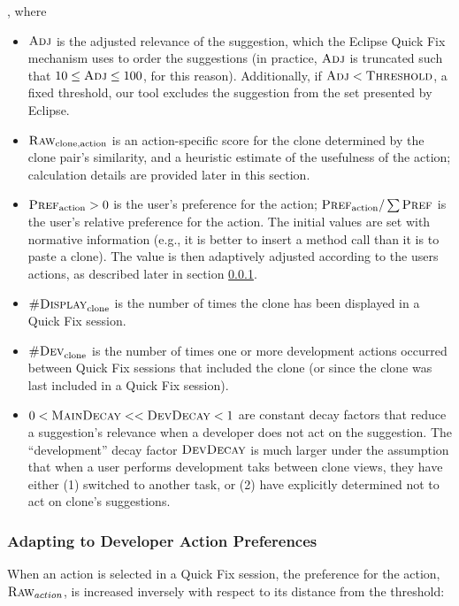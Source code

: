\documentclass[nocopyrightspace,10pt]{sigplanconf}
\begin{document}
\noindent, where 
\begin{itemize}
  \item $\textsc{Adj}$ is the adjusted relevance of the suggestion, which the
    Eclipse Quick Fix mechanism uses to order the suggestions (in
    practice, $\textsc{Adj}$ is truncated such that $10 \le \textsc{Adj} \le 100$,
    for this reason). Additionally, if $\textsc{Adj} < \textsc{Threshold}$, a fixed threshold, our
    tool excludes the suggestion from the set presented
    by Eclipse.
  \item $\textsc{Raw}_{\text{clone},\text{action}}$ is an action-specific score for the clone
    determined by the clone pair's similarity, and a heuristic
    estimate of the usefulness of the action; calculation details
    are provided later in this section.
  \item $\textsc{Pref}_{\text{action}} > 0$ is the user's preference for the action; $\textsc{Pref}_{\text{action}} / 
    \sum{\textsc{Pref}}$ is the user's relative preference for the action. The
    initial values are set with normative information (e.g., it is
    better to insert a method call than it is to paste a clone). The
    value is then adaptively adjusted according to the users actions, as described
    later in section \ref{sec:preference}.
  \item $\textsc{\#Display}_{\text{clone}}$ is the number of times the clone has been
    displayed in a Quick Fix session.
  \item $\textsc{\#Dev}_{\text{clone}}$ is the number of times one or more development
    actions occurred between Quick Fix sessions that included the
    clone (or since the clone was last included in a Quick Fix
    session).
  \item $0 < \textsc{MainDecay} << \textsc{DevDecay} < 1$ are constant
    decay factors that reduce a suggestion's relevance when a
    developer does not act on the suggestion. The ``development'' decay
    factor $\textsc{DevDecay}$ is much larger under the assumption
    that when a user performs development taks between clone views,
    they have either (1) switched to another task, or (2) have
    explicitly determined not to act on clone's suggestions.
\end{itemize} 

\subsubsection{Adapting to Developer Action Preferences}
\label{sec:preference}
When an action is selected in a Quick Fix session, the preference for
the action, $\textsc{Raw}_{action}$, is increased inversely with respect to its
distance from the threshold:
\end{document}
